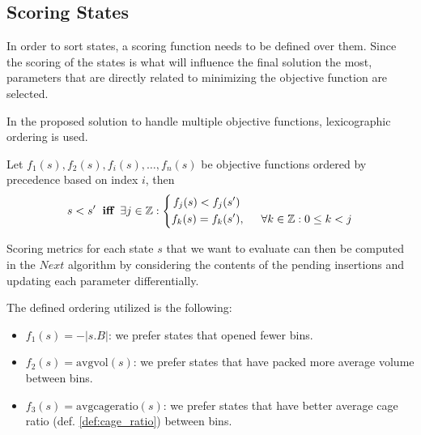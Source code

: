 



\subsection{Scoring States}
\label{ssec:scoring_states}%
In order to sort states, a scoring function needs to be defined over them.
Since the scoring of the states is what will influence the final solution the most, parameters that are directly related to minimizing the objective function are selected.

In the proposed solution to handle multiple objective functions, lexicographic ordering is used.
\begin{definition}
    \label{def:lexicographic_ordering}
    Let $f_1(s), f_2(s), f_i(s), \dots, f_n(s)$ be objective functions ordered by precedence based on index $i$, then 
    \begin{equation*}
        s < s^\prime \hspace{.2cm} \textbf{iff} \hspace{.2cm} \exists j \in \mathbb{Z} : \left\{
            \begin{aligned}
                f_j(s) < f_j(s^\prime) & \\
                f_k(s) = f_k(s^\prime) &,\hspace{.5cm} \forall k \in \mathbb{Z} : 0 \le k < j 
            \end{aligned}
        \right.
    \end{equation*}
\end{definition}

Scoring metrics for each state $s$ that we want to evaluate can then be computed in the $Next$ algorithm by considering the contents of the pending insertions and updating each parameter differentially.

The defined ordering utilized is the following:
\begin{itemize}
    \item $f_1(s) = -|s.B|$: we prefer states that opened fewer bins.
    \item $f_2(s) = \text{avgvol}(s)$: we prefer states that have packed more average volume between bins.
    \item $f_3(s) = \text{avgcageratio}(s)$: we prefer states that have better average cage ratio (def. \ref{def:cage_ratio}) between bins.
\end{itemize}


